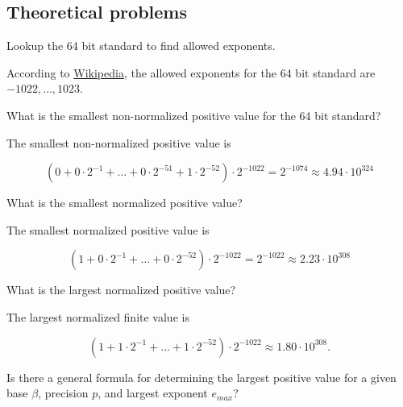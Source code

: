 \documentclass[]{book}
\theoremstyle{definition}
\theoremstyle{definition}
\theoremstyle{definition}
\theoremstyle{remark}
\let\BeginKnitrBlock\begin \let\EndKnitrBlock\end
\begin{document}
\subsection{Theoretical problems}\label{theoretical-problems-1}

\BeginKnitrBlock{exercise}
\protect\hypertarget{exr:q201}{}{\label{exr:q201} }Lookup the 64 bit
standard to find allowed exponents.
\EndKnitrBlock{exercise}

\BeginKnitrBlock{solution}
\iffalse{} {Solution. } \fi{}According to
\href{https://en.wikipedia.org/wiki/Double-precision_floating-point_format}{Wikipedia},
the allowed exponents for the 64 bit standard are
\(-1022,\ldots, 1023\).
\EndKnitrBlock{solution}

\BeginKnitrBlock{exercise}
\protect\hypertarget{exr:q202}{}{\label{exr:q202} }What is the smallest
non-normalized positive value for the 64 bit standard?
\EndKnitrBlock{exercise}

\BeginKnitrBlock{solution}
\iffalse{} {Solution. } \fi{}The smallest non-normalized positive value
is

\[
  \left(0 + 0\cdot 2^{-1} + \ldots + 0\cdot 2^{-51} + 1\cdot 2^{-52} \right )\cdot 2^{-1022} = 2^{-1074} \approx 4.94\cdot 10^{324}
\]
\EndKnitrBlock{solution}

\BeginKnitrBlock{exercise}
\protect\hypertarget{exr:q203}{}{\label{exr:q203} }What is the smallest
normalized positive value?
\EndKnitrBlock{exercise}

\BeginKnitrBlock{solution}
\iffalse{} {Solution. } \fi{}The smallest normalized positive value is

\[
  \left(1 + 0\cdot 2^{-1} + \ldots + 0\cdot 2^{-52} \right )\cdot 2^{-1022} = 2^{-1022} \approx 2.23 \cdot 10^{308}
\]
\EndKnitrBlock{solution}

\BeginKnitrBlock{exercise}
\protect\hypertarget{exr:q204}{}{\label{exr:q204} }What is the largest
normalized positive value?
\EndKnitrBlock{exercise}

\BeginKnitrBlock{solution}
\iffalse{} {Solution. } \fi{}The largest normalized finite value is

\[
  \left(1 + 1\cdot 2^{-1} + \ldots + 1\cdot 2^{-52} \right )\cdot 2^{-1022} \approx 1.80\cdot 10^{308}.
\]
\EndKnitrBlock{solution}

\BeginKnitrBlock{exercise}
\protect\hypertarget{exr:q205}{}{\label{exr:q205} }Is there a general
formula for determining the largest positive value for a given base
\(\beta\), precision \(p\), and largest exponent \(e_{max}\)?
\EndKnitrBlock{exercise}
\end{document}
